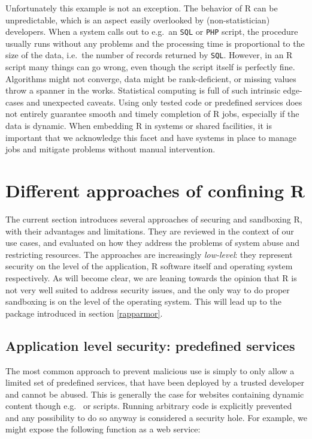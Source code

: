 \documentclass{jss}
\newcommand{\R}{\textsf{R}\xspace}
\newcommand{\RAppArmor}{\pkg{RAppArmor}\xspace}
\begin{document}
Unfortunately this example is not an exception. The behavior of \R can be
unpredictable, which is an aspect easily overlooked by
(non-statistician) developers. When a system calls out to e.g.\ an \texttt{SQL}
or \texttt{PHP} script, the procedure usually runs without any problems and the
processing time is proportional to the size of the data, i.e.\ the number
of records returned by \texttt{SQL}. However, in an \R
script many things can go wrong, even though the script itself is perfectly
fine.  Algorithms might not converge, data might be rank-deficient, or missing
values throw a spanner in the works.
Statistical computing is full of such intrinsic edge-cases and unexpected caveats.
Using only tested code or predefined services does not entirely guarantee smooth and timely
completion of \R jobs, especially if the data is dynamic. When embedding
\R in systems or shared facilities, it is important that we acknowledge this
facet and have systems in place to manage jobs and mitigate problems without
manual intervention.

\section[Different approaches of confining R]{Different approaches of confining
\R}

The current section introduces several approaches of securing and sandboxing
\R, with their advantages and limitations. They are reviewed in the
context of our use cases, and evaluated on how they address the problems of
system abuse and restricting resources. The approaches are increasingly
\emph{low-level}: they represent security on the level of the application, R
software itself and operating system respectively. As will become clear, we are
leaning towards the opinion that \R is not very well suited to address security issues, and the only way to do proper sandboxing is on the level of the
operating system. This will lead up to the \RAppArmor
package introduced in section \ref{rapparmor}.


\subsection{Application level security: predefined services}

The most common approach to prevent malicious use is simply to only allow a
limited set of predefined services, that have been deployed by a trusted
developer and cannot be abused. This is generally the case for websites
containing dynamic content though e.g.\  or  scripts.
Running arbitrary code is explicitly prevented and any possibility to do so
anyway is considered a security hole. For example, we might expose the
following function as a web service:
\end{document}
